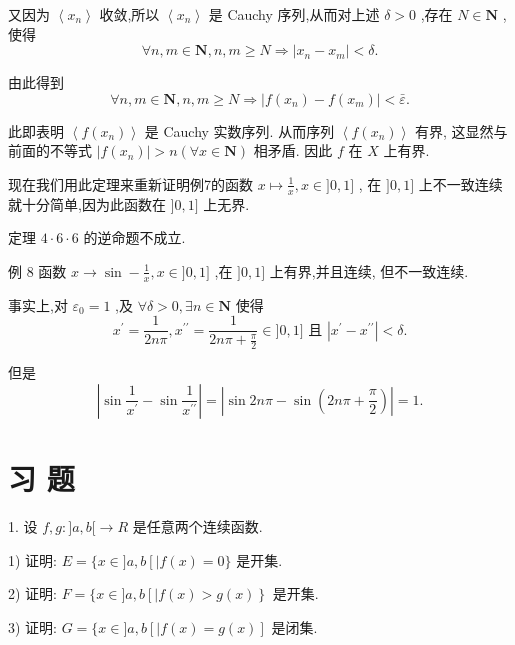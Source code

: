 又因为 $\left\langle  {x}_{n}\right\rangle$ 收敛,所以 $\left\langle  {x}_{n}\right\rangle$ 是 Cauchy 序列,从而对上述 $\delta  > 0$ ,存在 $N \in  \mathbf{N}$ ,使得
$$\forall n,m \in  \mathbf{N},n,m \geq  N \Rightarrow  \left| {{x}_{n} - {x}_{m}}\right|  < \delta .$$

由此得到
$$\forall n,m \in  \mathbf{N},n,m \geq  N \Rightarrow  \left| {f\left( {x}_{n}\right)  - f\left( {x}_{m}\right) }\right|  < \bar{\varepsilon }.$$

此即表明 $\left\langle  {f\left( {x}_{n}\right) }\right\rangle$ 是 Cauchy 实数序列. 从而序列 $\left\langle  {f\left( {x}_{n}\right) }\right\rangle$ 有界, 这显然与前面的不等式 $\left| {f\left( {x}_{n}\right) }\right|  > n\left( {\forall x \in  \mathbf{N}}\right)$ 相矛盾. 因此 $f$ 在 $X$ 上有界.

现在我们用此定理来重新证明例7的函数 $x \mapsto  \frac{1}{x},x \in  \rbrack 0,1\rbrack$ , 在 $\rbrack 0,1\rbrack$ 上不一致连续就十分简单,因为此函数在 $\rbrack 0,1\rbrack$ 上无界.

定理 $4 \cdot  6 \cdot  6$ 的逆命题不成立.

例 8 函数 $x \rightarrow  \sin  - \frac{1}{x},x \in  \rbrack 0,1\rbrack$ ,在 $\rbrack 0,1\rbrack$ 上有界,并且连续, 但不一致连续.

事实上,对 ${\varepsilon }_{0} = 1$ ,及 $\forall \delta  > 0,\exists n \in  \mathbf{N}$ 使得
$${x}^{\prime } = \frac{1}{2n\pi },{x}^{\prime \prime } = \frac{1}{{2n\pi } + \frac{\pi }{2}} \in  \rbrack 0,1\rbrack \text{ 且 }\left| {{x}^{\prime } - {x}^{\prime \prime }}\right|  < \delta .$$

但是
$$\left| {\sin \frac{1}{{x}^{\prime }} - \sin \frac{1}{{x}^{\prime \prime }}}\right|  = \left| {\sin {2n\pi } - \sin \left( {{2n\pi } + \frac{\pi }{2}}\right) }\right|  = 1.$$

\section*{习 题}

1. 设 $f,g : \rbrack a,b\lbrack  \rightarrow  R$ 是任意两个连续函数.

1) 证明: $E = \{ x \in  \rbrack a,b\left\lbrack  {\mid f\left( x\right)  = 0}\right. \}$ 是开集.

2) 证明: $F = \{ x \in  \rbrack a,b\left\lbrack  {\mid f\left( x\right)  > g\left( x\right) }\right\}$ 是开集.

3) 证明: $G = \{ x \in  \rbrack a,b\left\lbrack  {\mid f\left( x\right)  = g\left( x\right) }\right\rbrack$ 是闭集.

